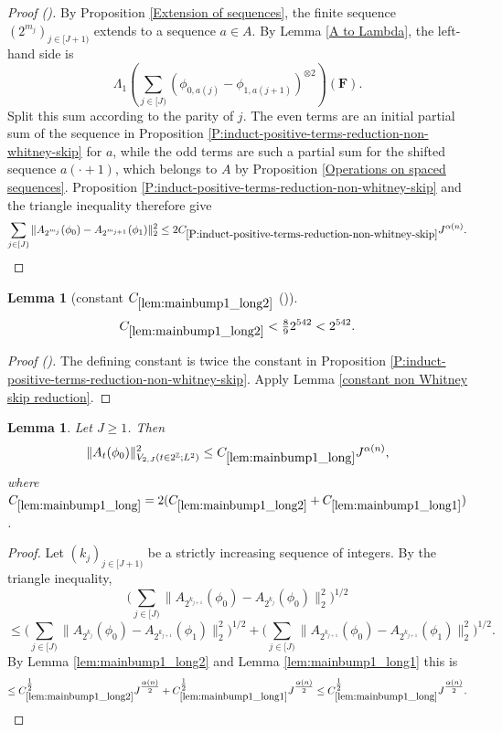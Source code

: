 \documentclass[12pt,reqno]{amsart}
\newcommand{\auto}{{({\tiny\faCar})}}
\theoremstyle{plain}
\newtheorem{lemma}[theorem]{Lemma}
\numberwithin{equation}{section}
\theoremstyle{remark}
\newcommand{\uses}[1]{}
\newcommand{\usesdefs}[1]{}
\newcommand{\F}{\mathbf{F}}
\begin{document}
\begin{proof}[Proof \auto]
By Proposition \ref{Extension of sequences}, the finite sequence $(2^{m_j})_{j\in[J+1)}$ extends to a sequence $a\in A$. By Lemma \ref{A to Lambda}, the left-hand side is
\[
\Lambda_1\left(\sum_{j\in[J)}
(\phi_{0,a(j)}-\phi_{1,a(j+1)})^{\otimes2}\right)(\F).
\]
Split this sum according to the parity of $j$. The even terms are an initial partial sum of the sequence in Proposition \ref{P:induct-positive-terms-reduction-non-whitney-skip} for $a$, while the odd terms are such a partial sum for the shifted sequence $a(\cdot+1)$, which belongs to $A$ by Proposition \ref{Operations on spaced sequences}. Proposition \ref{P:induct-positive-terms-reduction-non-whitney-skip} and the triangle inequality therefore give
\[
\sum_{j\in[J)}
\|A_{2^{m_j}}(\phi_0)-A_{2^{m_{j+1}}}(\phi_1)\|_2^2
\le2C_{\ref{P:induct-positive-terms-reduction-non-whitney-skip}}J^{\alpha(n)}.
\]
\end{proof}

\begin{lemma}[constant $C_{\ref{lem:mainbump1_long2}}$ \auto]\label{constant main bump one long two}\uses{P:induct-positive-terms-reduction-non-whitney-skip,constant non Whitney skip reduction,lem:mainbump1_long2}\usesdefs{}
\begin{equation}\label{constant main bump one long two bound}
C_{\ref{lem:mainbump1_long2}}<\tfrac89 2^{542}<2^{542}.
\end{equation}
\end{lemma}
\begin{proof}[Proof \auto]
The defining constant is twice the constant in Proposition \ref{P:induct-positive-terms-reduction-non-whitney-skip}. Apply Lemma \ref{constant non Whitney skip reduction}.
\end{proof}

\begin{lemma}\label{lem:mainbump1_long}\uses{lem:mainbump1_long2,lem:mainbump1_long1}\usesdefs{A_def,def:unipair}
Let $J\ge 1$. Then
\begin{equation}\label{mainbump1_long}
\|A_{t}(\phi_0)\|^2_{V_{2,J}(t\in 2^\mathbb{Z}; L^2)}  \le C_{\ref{lem:mainbump1_long}} J^{\alpha(n)},
\end{equation}
where $C_{\ref{lem:mainbump1_long}}=2(C_{\ref{lem:mainbump1_long2}} + C_{\ref{lem:mainbump1_long1}})$.
\end{lemma}

\begin{proof}
Let $(k_j)_{j\in [J+1)}$ be a strictly increasing sequence of integers.
By the triangle inequality,
\[ \Big(\sum_{j\in [J)} \|A_{2^{k_{j+1}}}(\phi_0)- A_{2^{k_j}}(\phi_0)\|_2^2\Big)^{1/2} \]
\[ \le \Big(\sum_{j\in [J)} \|A_{2^{k_{j}}}(\phi_0)- A_{2^{k_{j+1}}}(\phi_1)\|_2^2\Big)^{1/2}
+ \Big(\sum_{j\in [J)} \|A_{2^{k_{j+1}}}(\phi_0)- A_{2^{k_{j+1}}}(\phi_1)\|_2^2\Big)^{1/2}.
\]
By Lemma \ref{lem:mainbump1_long2} and Lemma \ref{lem:mainbump1_long1} this is
\[ \le C_{\ref{lem:mainbump1_long2}}^{\tfrac12} J^{\tfrac{\alpha(n)}{2}} + C_{\ref{lem:mainbump1_long1}}^{\tfrac12} J^{\tfrac{\alpha(n)}{2}} \le C_{\ref{lem:mainbump1_long}}^{\tfrac12} J^{\tfrac{\alpha(n)}{2}}.  \]
\end{proof}
\end{document}
